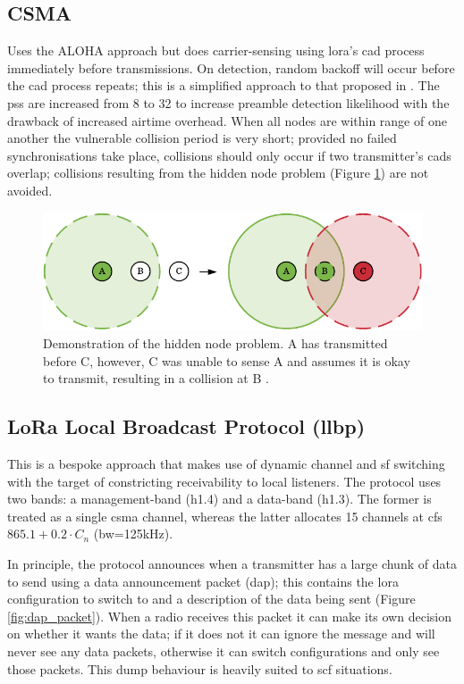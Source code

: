 \subsection{CSMA}
Uses the ALOHA approach but does carrier-sensing using \ac{lora}'s \ac{cad} process immediately before transmissions. On detection, random backoff will occur before the \ac{cad} process repeats; this is a simplified approach to that proposed in \cite{3YP:LORA_CSMA}. The \ac{ps}s are increased from 8 to 32 to increase preamble detection likelihood with the drawback of increased airtime overhead. When all nodes are within range of one another the vulnerable collision period is very short; provided no failed synchronisations take place, collisions should only occur if two transmitter's \ac{cad}s overlap; collisions resulting from the hidden node problem (Figure \ref{fig:hidden_node_problem}) are not avoided.

\begin{figure}[H]
    \centering
   	\includegraphics{Figures/hidden_node_problem}
    \caption[Demonstration of hidden node problem]{
    	Demonstration of the hidden node problem. A has transmitted before C, however, C was unable to sense A and assumes it is okay to transmit, resulting in a collision at B \cite{3YP:WSN_BOOK}.
    }
    \label{fig:hidden_node_problem}
\end{figure}


\subsection{LoRa Local Broadcast Protocol (\ac{llbp})}
This is a bespoke approach that makes use of dynamic channel and \ac{sf} switching with the target of constricting receivability to local listeners. The protocol uses two bands: a management-band (h1.4) and a data-band (h1.3). The former is treated as a single \ac{csma} channel, whereas the latter allocates 15 channels at \ac{cf}s $865.1 + 0.2 \cdot C_n$ (\ac{bw}=125kHz).

In principle, the protocol announces when a transmitter has a large chunk of data to send using a data announcement packet (\ac{dap}); this contains the \ac{lora} configuration to switch to and a description of the data being sent (Figure \ref{fig:dap_packet}). When a radio receives this packet it can make its own decision on whether it wants the data; if it does not it can ignore the message and will never see any data packets, otherwise it can switch configurations and only see those packets. This dump behaviour is heavily suited to \ac{scf} situations.

